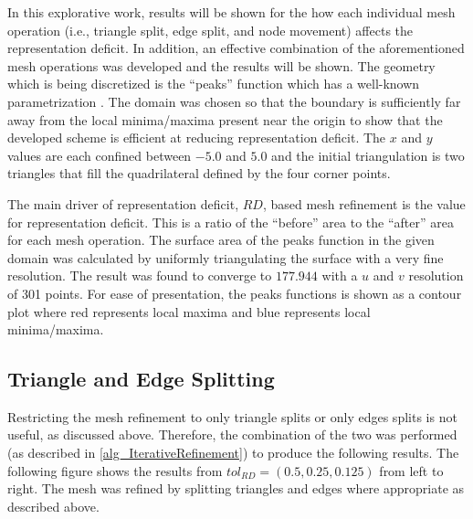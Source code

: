 In this explorative work, results will be shown for the how each
individual mesh operation (i.e., triangle split, edge split, and node 
movement) affects the representation deficit. In addition, an effective
combination of the aforementioned mesh operations was developed and the
results will be shown. The geometry which is being discretized is the
``peaks'' function which has a well-known parametrization
\cite{peaksMatlab}. The domain was chosen so that the boundary is
sufficiently far away from the local minima/maxima present near the origin to
show that the developed scheme is efficient at reducing representation
deficit. The $x$ and $y$ values are each confined between $-5.0$ and
$5.0$ and the initial triangulation is two triangles that fill the
quadrilateral defined by the four corner points.

The main driver of representation deficit, $RD$, based mesh refinement
is the value for representation deficit. This is a ratio of the
``before'' area to the ``after'' area for each mesh operation. The
surface area of the peaks function in the given domain was calculated by
uniformly triangulating the surface with a very fine resolution. The
result was found to converge to $177.944$ with a $u$ and $v$ resolution
of 301 points. For ease of presentation, the peaks functions is shown as
a contour plot where red represents local maxima and blue represents
local minima/maxima.

\subsection{Triangle and Edge Splitting}
Restricting the mesh refinement to only triangle splits or only edges
splits is not useful, as discussed above. Therefore, the combination of
the two was performed (as described in \ref{alg_IterativeRefinement})
to produce the following results. The following figure shows the results
from $tol_{RD}=\left(0.5,0.25,0.125\right)$ from left to right. The mesh was
refined by splitting triangles and edges where appropriate as described
above.


